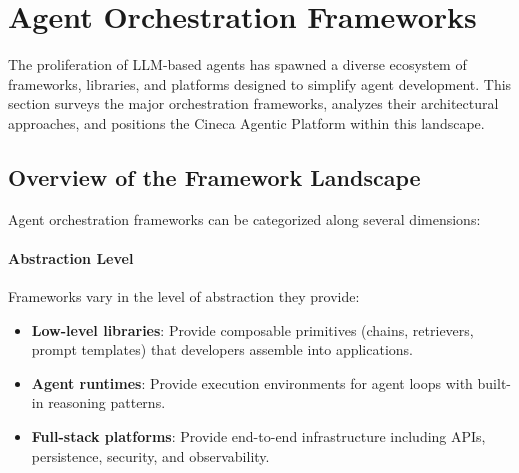 %
%

\section{Agent Orchestration Frameworks}
\label{sec:orchestration-frameworks}

The proliferation of LLM-based agents has spawned a diverse ecosystem of frameworks, libraries, and platforms designed to simplify agent development. This section surveys the major orchestration frameworks, analyzes their architectural approaches, and positions the Cineca Agentic Platform within this landscape.

\subsection{Overview of the Framework Landscape}

Agent orchestration frameworks can be categorized along several dimensions:

\paragraph{Abstraction Level}
Frameworks vary in the level of abstraction they provide:
\begin{itemize}
    \item \textbf{Low-level libraries}: Provide composable primitives (chains, retrievers, prompt templates) that developers assemble into applications.
    \item \textbf{Agent runtimes}: Provide execution environments for agent loops with built-in reasoning patterns.
    \item \textbf{Full-stack platforms}: Provide end-to-end infrastructure including APIs, persistence, security, and observability.
\end{itemize}


